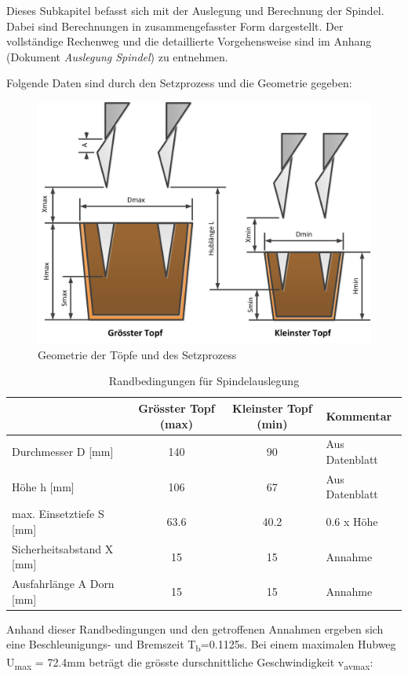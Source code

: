 Dieses Subkapitel befasst sich mit der Auslegung und Berechnung der Spindel. Dabei sind Berechnungen in zusammengefasster Form dargestellt. Der vollständige Rechenweg und die detaillierte Vorgehensweise sind im Anhang (Dokument \textit{Auslegung Spindel}) zu entnehmen.

Folgende Daten sind durch den Setzprozess und die Geometrie gegeben:
	\begin{figure}[H]
	\includegraphics[width=1\textwidth]{Illustrationen/6-Umsetzung/topfgeometrie.png}
	\caption{Geometrie der Töpfe und des Setzprozess}
	\label{fig:topfgeometrie}
	\end{figure}
\begin{table}[H]
\begin{tabular}{|l|c|c|l|}
	\hline 
	& Grösster Topf (max) & Kleinster Topf (min) & Kommentar \\ 
	\hline 
	Durchmesser D [mm] & 140 & 90 & Aus Datenblatt \\ 
	\hline 
	Höhe h [mm] & 106 & 67 & Aus Datenblatt \\ 
	\hline 
	max. Einsetztiefe S [mm] & 63.6 & 40.2 & 0.6 x Höhe \\ 
	\hline 
	Sicherheitsabstand X [mm] & 15 & 15 & Annahme \\ 
	\hline 
	Ausfahrlänge A Dorn [mm] & 15 & 15 & Annahme \\ 
	\hline 
\end{tabular} 
	\caption{Randbedingungen für Spindelauslegung}
	\label{tab:Randbedingungen}
\end{table}

Anhand dieser Randbedingungen und den getroffenen Annahmen ergeben sich eine Beschleunigungs- und Bremszeit T\textsubscript{b}=0.1125s. Bei einem maximalen Hubweg U\textsubscript{max} = 72.4mm beträgt die grösste durschnittliche Geschwindigkeit v\textsubscript{avmax}:

